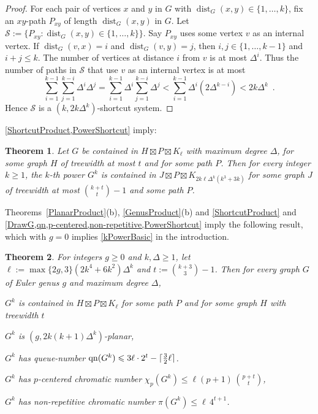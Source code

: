 \documentclass{patmorin}
\theoremstyle{plain}
\newtheorem{thm}{Theorem}
\theoremstyle{definition}
\DeclareMathOperator{\dist}{dist}
\DeclareMathOperator{\qn}{qn}
\DeclarePairedDelimiter{\ceil}{\lceil}{\rceil}
\renewcommand{\SS}{\mathcal{S}}
\renewcommand{\geq}{\geqslant}
\renewcommand{\leq}{\leqslant}
\begin{document}
\begin{proof}
For each pair of vertices $x$ and $y$ in $G$ with $\dist_G(x,y)\in\{1,\dots,k\}$, fix an $xy$-path $P_{xy}$ of length
$\dist_G(x,y)$  in $G$. Let $\SS:=\{P_{xy}: \dist_G(x,y)\in\{1,\dots,k\} \}$. Say $P_{xy}$ uses some vertex $v$ as an internal vertex. If $\dist_G(v,x)=i$ and $\dist_G(v,y)=j$, then $i,j\in\{1,\dots,k-1\}$ and $i+j\leq k$. The number of vertices at distance $i$ from $v$ is at most $\Delta^i$. Thus the number of paths in $\SS$ that use $v$ as an internal vertex is at most
\[\sum_{i=1}^{k-1} \sum_{j=1}^{k-i} \Delta^i\Delta^j
= \sum_{i=1}^{k-1} \Delta^i \sum_{j=1}^{k-i} \Delta^j
< \sum_{i=1}^{k-1} \Delta^i ( 2 \Delta^{k-i} )
< 2k \Delta^k\enspace.\]
Hence $\SS$ is a $(k, 2k \Delta^k)$-shortcut system.
\end{proof}

\cref{ShortcutProduct,PowerShortcut} imply:

\begin{thm}
\label{PowerProduct}
Let $G$ be contained in $H\boxtimes P\boxtimes K_\ell$ with maximum degree $\Delta$, for some graph $H$ of treewidth at most $t$ and for some path $P$. Then for every integer $k\geq 1$, the $k$-th power $G^k$ is contained in $J\boxtimes P\boxtimes K_{2k \ell \Delta^{k}(k^3+3k)}$ for some graph $J$ of treewidth at most $\binom{k+t}{t}-1$ and some path $P$.
\end{thm}


Theorems~\ref{PlanarProduct}(b), \ref{GenusProduct}(b) and \cref{ShortcutProduct} and  \cref{DrawG,qn,p-centered,non-repetitive,PowerShortcut} imply the following result, which with $g=0$ implies  \cref{kPowerBasic} in the introduction.

\begin{thm}
\label{PowerGenus}
For integers $g\geq 0$ and $k,\Delta\geq 1$, let $\ell:= \max\{2g,3\} (2k^4+6k^2) \Delta^{k}$ and $t:= \binom{k+3}{3}-1$. Then for every graph $G$ of Euler genus $g$ and maximum degree $\Delta$,
\begin{compactitem}
\item $G^k$ is contained in $H\boxtimes P \boxtimes K_{\ell}$ for some path $P$ and for some graph $H$ with treewidth $t$
\item $G^k$ is $(g, 2k(k+1)\Delta^{k} )$-planar,
\item $G^k$ has queue-number $\qn(G^k) \leq 3 \ell \cdot 2^t - \ceil{\tfrac{3}{2}\ell}$.
\item $G^k$ has  $p$-centered chromatic number $\chi_p(G^k) \leq \ell (p+1)\,  \binom{p+t}{t}$,
\item $G^k$ has  non-repetitive chromatic number $ \pi(G^k) \leq \ell \, 4^{t+1}$.
\end{compactitem}
\end{thm}
\end{document}
